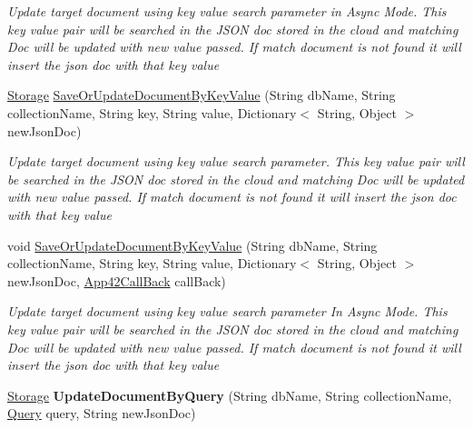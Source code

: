 \begin{DoxyCompactItemize}
\begin{DoxyCompactList}\small\item\em Update target document using key value search parameter in Async Mode. This key value pair will be searched in the J\+S\+O\+N doc stored in the cloud and matching Doc will be updated with new value passed. If match document is not found it will insert the json doc with that key value \end{DoxyCompactList}\item 
\hyperlink{classcom_1_1shephertz_1_1app42_1_1paas_1_1sdk_1_1csharp_1_1storage_1_1_storage}{Storage} \hyperlink{classcom_1_1shephertz_1_1app42_1_1paas_1_1sdk_1_1csharp_1_1storage_1_1_storage_service_a68e3383367ac435d280baacc5c77268c}{Save\+Or\+Update\+Document\+By\+Key\+Value} (String db\+Name, String collection\+Name, String key, String value, Dictionary$<$ String, Object $>$ new\+Json\+Doc)
\begin{DoxyCompactList}\small\item\em Update target document using key value search parameter. This key value pair will be searched in the J\+S\+O\+N doc stored in the cloud and matching Doc will be updated with new value passed. If match document is not found it will insert the json doc with that key value \end{DoxyCompactList}\item 
void \hyperlink{classcom_1_1shephertz_1_1app42_1_1paas_1_1sdk_1_1csharp_1_1storage_1_1_storage_service_a331cf2dc54c862544f4d11d02b1b90c7}{Save\+Or\+Update\+Document\+By\+Key\+Value} (String db\+Name, String collection\+Name, String key, String value, Dictionary$<$ String, Object $>$ new\+Json\+Doc, \hyperlink{interfacecom_1_1shephertz_1_1app42_1_1paas_1_1sdk_1_1csharp_1_1_app42_call_back}{App42\+Call\+Back} call\+Back)
\begin{DoxyCompactList}\small\item\em Update target document using key value search parameter In Async Mode. This key value pair will be searched in the J\+S\+O\+N doc stored in the cloud and matching Doc will be updated with new value passed. If match document is not found it will insert the json doc with that key value \end{DoxyCompactList}\item 
\hypertarget{classcom_1_1shephertz_1_1app42_1_1paas_1_1sdk_1_1csharp_1_1storage_1_1_storage_service_ab7c6ca5f44ebc3d20913f6b4895d7ad4}{\hyperlink{classcom_1_1shephertz_1_1app42_1_1paas_1_1sdk_1_1csharp_1_1storage_1_1_storage}{Storage} {\bfseries Update\+Document\+By\+Query} (String db\+Name, String collection\+Name, \hyperlink{classcom_1_1shephertz_1_1app42_1_1paas_1_1sdk_1_1csharp_1_1storage_1_1_query}{Query} query, String new\+Json\+Doc)}\label{classcom_1_1shephertz_1_1app42_1_1paas_1_1sdk_1_1csharp_1_1storage_1_1_storage_service_ab7c6ca5f44ebc3d20913f6b4895d7ad4}


\end{DoxyCompactItemize}
